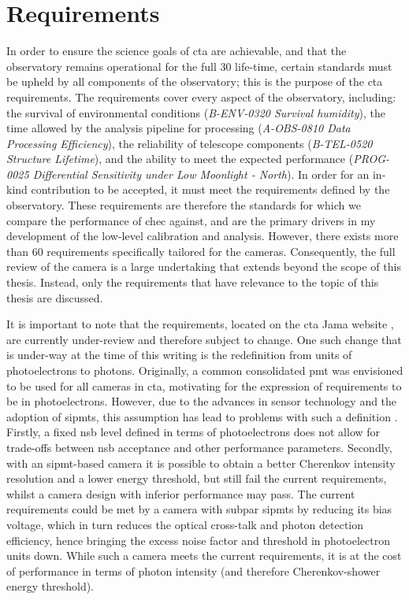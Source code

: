\section{Requirements}

In order to ensure the science goals of \gls{cta} are achievable, and that the observatory remains operational for the full 30 life-time, certain standards must be upheld by all components of the observatory; this is the purpose of the \gls{cta} requirements. The requirements cover every aspect of the observatory, including: the survival of environmental conditions (\textit{B-ENV-0320 Survival humidity}), the time allowed by the analysis pipeline for processing (\textit{A-OBS-0810 Data Processing Efficiency}), the reliability of telescope components (\textit{B-TEL-0520 Structure Lifetime}), and the ability to meet the expected performance (\textit{PROG-0025 Differential Sensitivity under Low Moonlight - North}). In order for an in-kind contribution to be accepted, it must meet the requirements defined by the observatory. These requirements are therefore the standards for which we compare the performance of \gls{chec} against, and are the primary drivers in my development of the low-level calibration and analysis. However, there exists more than 60 requirements specifically tailored for the cameras. Consequently, the full review of the camera is a large undertaking that extends beyond the scope of this thesis. Instead, only the requirements that have relevance to the topic of this thesis are discussed.

It is important to note that the requirements, located on the \gls{cta} Jama website \cite{cta-jama}, are currently under-review and therefore subject to change. One such change that is under-way at the time of this writing is the redefinition from units of photoelectrons to photons. Originally, a common consolidated \gls{pmt} was envisioned to be used for all cameras in \gls{cta}, motivating for the expression of requirements to be in photoelectrons. However, due to the advances in sensor technology and the adoption of \glspl{sipmt}, this assumption has lead to problems with such a definition \cite{petophotons}. Firstly, a fixed \gls{nsb} level defined in terms of photoelectrons does not allow for trade-offs between \gls{nsb} acceptance and other performance parameters. Secondly, with an \gls{sipmt}-based camera it is possible to obtain a better Cherenkov intensity resolution and a lower energy threshold, but still fail the current requirements, whilst a camera design with inferior performance may pass. The current requirements could be met by a camera with subpar \glspl{sipmt} by reducing its bias voltage, which in turn reduces the optical cross-talk and photon detection efficiency, hence bringing the excess noise factor and threshold in photoelectron units down. While such a camera meets the current requirements, it is at the cost of performance in terms of photon intensity (and therefore Cherenkov-shower energy threshold). 

